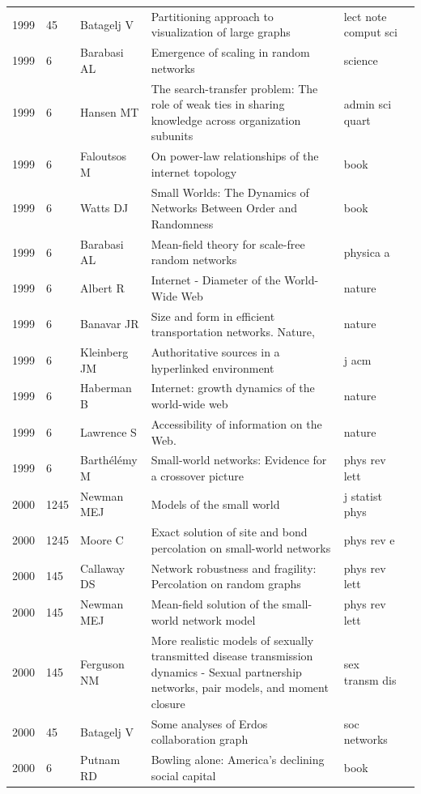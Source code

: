 \documentclass[11pt]{article} %
\begin{document}
\begin{landscape}
\begin{longtable}{p{0.7cm}|p{0.8cm}|p{3cm}|p{14.5cm}|p{3.5cm}l}
1999& 	45& 	 Batagelj V& 	 Partitioning approach to visualization of large graphs& 	 lect note comput sci\\
1999& 	6& 	 Barabasi AL& 	 Emergence of scaling in random networks& 	 science\\
1999& 	6& 	 Hansen MT& 	 The search-transfer problem: The role of weak ties in sharing knowledge across organization subunits& 	 admin sci quart\\
1999& 	6& 	 Faloutsos M& 	 On power-law relationships of the internet topology& 	 book\\
1999& 	6& 	 Watts DJ& 	 Small Worlds: The Dynamics of Networks Between Order and Randomness& 	 book\\
1999& 	6& 	 Barabasi AL& 	 Mean-field theory for scale-free random networks& 	 physica a\\
1999& 	6& 	 Albert R& 	 Internet - Diameter of the World-Wide Web& 	 nature\\
1999& 	6& 	 Banavar JR& 	 Size and form in efficient transportation networks. Nature,& 	 nature\\
1999& 	6& 	 Kleinberg JM& 	 Authoritative sources in a hyperlinked environment& 	 j acm\\
1999& 	6& 	 Haberman B& 	 Internet: growth dynamics of the world-wide web& 	 nature\\
1999& 	6& 	 Lawrence S& 	 Accessibility of information on the Web. & 	 nature \\
1999& 	6& 	 Barthélémy M & 	 Small-world networks: Evidence for a crossover picture& 	 phys rev lett\\
2000& 	1245& 	 Newman MEJ& 	 Models of the small world& 	 j statist phys\\
2000& 	1245& 	 Moore C& 	 Exact solution of site and bond percolation on small-world networks& 	 phys rev e\\
2000& 	145& 	 Callaway DS& 	 Network robustness and fragility: Percolation on random graphs& 	 phys rev lett\\
2000& 	145& 	 Newman MEJ& 	 Mean-field solution of the small-world network model& 	 phys rev lett\\
2000& 	145& 	 Ferguson NM& 	 More realistic models of sexually transmitted disease transmission dynamics - Sexual partnership networks, pair models, and moment closure& 	 sex transm dis\\
2000& 	45& 	 Batagelj V& 	 Some analyses of Erdos collaboration graph& 	 soc networks\\
2000& 	6& 	 Putnam RD & 	 Bowling alone: America’s declining social capital& 	 book\\

\end{longtable}
\end{landscape}
\end{document}
